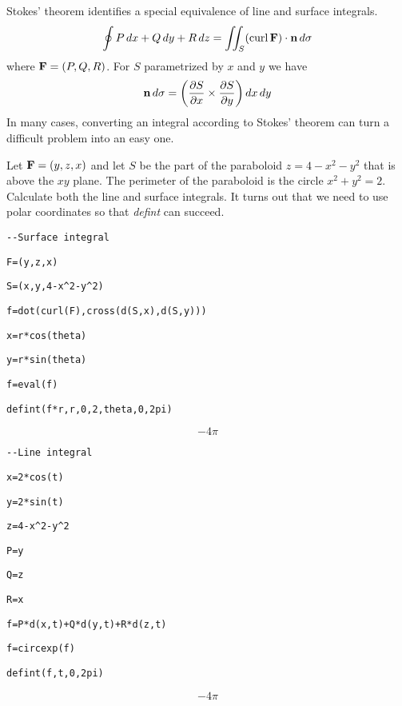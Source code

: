 
\noindent
Stokes' theorem identifies a special equivalence of line and surface
integrals.
%
$$\oint P\,dx+Q\,dy+R\,dz
=\int\!\!\!\int_S(\mathop{\rm curl}{\bf F})\cdot{\bf n}\,d\sigma
$$
where ${\bf F}=(P,Q,R)$.
For $S$ parametrized by $x$ and $y$ we have
$${\bf n}\,d\sigma=\left(
{\partial S\over\partial x}\times{\partial S\over\partial y}
\right)dx\,dy$$
In many cases, converting an integral according to
Stokes' theorem can turn a difficult problem into an easy one.

\medskip
\noindent
Let ${\bf F}=(y,z,x)$ and let $S$ be the part of the paraboloid $z=4-x^2-y^2$
that is above the $xy$ plane.
The perimeter of the paraboloid is the circle $x^2+y^2=2$.
Calculate both the line and surface integrals.
It turns out that we need to use polar coordinates so that {\it defint} can
succeed.

\medskip
\verb$--Surface integral$

\verb$F=(y,z,x)$

\verb$S=(x,y,4-x^2-y^2)$

\verb$f=dot(curl(F),cross(d(S,x),d(S,y)))$

\verb$x=r*cos(theta)$

\verb$y=r*sin(theta)$

\verb$f=eval(f)$

\verb$defint(f*r,r,0,2,theta,0,2pi)$

$$-4\pi$$

\verb$--Line integral$

\verb$x=2*cos(t)$

\verb$y=2*sin(t)$

\verb$z=4-x^2-y^2$

\verb$P=y$

\verb$Q=z$

\verb$R=x$

\verb$f=P*d(x,t)+Q*d(y,t)+R*d(z,t)$

\verb$f=circexp(f)$

\verb$defint(f,t,0,2pi)$

$$-4\pi$$

